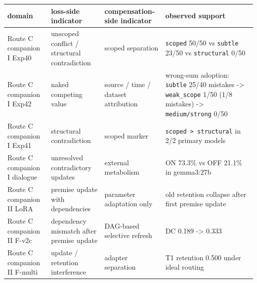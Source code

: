 \documentclass[12pt,a4paper]{article}
\begin{document}
{\def\LTcaptype{table} %
\begin{longtable}[]{@{}
  >{\raggedright\arraybackslash}p{}
  >{\raggedright\arraybackslash}p{}
  >{\raggedright\arraybackslash}p{}
  >{\raggedright\arraybackslash}p{}@{}}
\toprule\noalign{}
\begin{minipage}[b]{\linewidth}\raggedright
domain
\end{minipage} & \begin{minipage}[b]{\linewidth}\raggedright
loss-side indicator
\end{minipage} & \begin{minipage}[b]{\linewidth}\raggedright
compensation-side indicator
\end{minipage} & \begin{minipage}[b]{\linewidth}\raggedright
observed support
\end{minipage} \\
\midrule\noalign{}
\endhead
\bottomrule\noalign{}
\endlastfoot
Route C companion I Exp40 & unscoped conflict / structural contradiction & scoped separation & \texttt{scoped} 50/50 vs \texttt{subtle} 23/50 vs \texttt{structural} 0/50 \\
Route C companion I Exp42 & naked competing value & source / time / dataset attribution & wrong-sum adoption: \texttt{subtle} 25/40 mistakes -\textgreater{} \texttt{weak\_scope} 1/50 (1/8 mistakes) -\textgreater{} \texttt{medium/strong} 0/50 \\
Route C companion I Exp41 & structural contradiction & scoped marker & \texttt{scoped\ \textgreater{}\ structural} in 2/2 primary models \\
Route C companion I dialogue & unresolved contradictory updates & external metabolism & ON 73.3\% vs OFF 21.1\% in gemma3:27b \\
Route C companion II LoRA & premise update with dependencies & parameter adaptation only & old retention collapse after first premise update \\
Route C companion II F-v2c & dependency mismatch after premise update & DAG-based selective refresh & DC 0.189 -\textgreater{} 0.333 \\
Route C companion II F-multi & update / retention interference & adapter separation & T1 retention 0.500 under ideal routing \\
\end{longtable}
}
\end{document}
